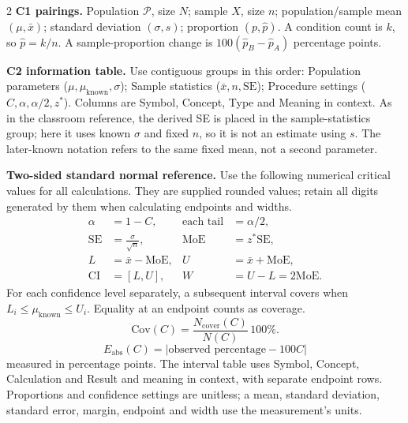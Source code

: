 \begin{multicols}{2}
\begingroup\small
\textbf{C1 pairings.} Population $\mathcal P$, size $N$; sample $X$, size $n$; population/sample mean $(\mu,\bar x)$; standard deviation $(\sigma,s)$; proportion $(p,\hat p)$. A condition count is $k$, so $\hat p=k/n$. A sample-proportion change is $100(\hat p_B-\hat p_A)$ percentage points.

\textbf{C2 information table.} Use contiguous groups in this order: Population parameters ($\mu,\mu_{\mathrm{known}},\sigma$); Sample statistics ($\bar x,n,\mathrm{SE}$); Procedure settings ($C,\alpha,\alpha/2,z^*$). Columns are Symbol, Concept, Type and Meaning in context. As in the classroom reference, the derived SE is placed in the sample-statistics group; here it uses known $\sigma$ and fixed $n$, so it is not an estimate using $s$. The later-known notation refers to the same fixed mean, not a second parameter.

\textbf{Two-sided standard normal reference.} Use the following numerical critical values for all calculations. They are supplied rounded values; retain all digits generated by them when calculating endpoints and widths.
\[
\begin{aligned}
\alpha&=1-C, &\text{each tail}&=\alpha/2,\\
\mathrm{SE}&=\frac{\sigma}{\sqrt n}, &\mathrm{MoE}&=z^*\mathrm{SE},\\
L&=\bar x-\mathrm{MoE}, &U&=\bar x+\mathrm{MoE},\\
\mathrm{CI}&=[L,U], &W&=U-L=2\mathrm{MoE}.
\end{aligned}
\]
For each confidence level separately, a subsequent interval covers when
$L_i\leq\mu_{\mathrm{known}}\leq U_i$. Equality at an endpoint counts as coverage.
\[
\mathrm{Cov}(C)=\frac{N_{\mathrm{cover}}(C)}{N(C)}\,100\%.
\]
\[
E_{\mathrm{abs}}(C)=|\text{observed percentage}-100C|
\]
measured in percentage points.
The interval table uses Symbol, Concept, Calculation and Result and meaning in context, with separate endpoint rows. Proportions and confidence settings are unitless; a mean, standard deviation, standard error, margin, endpoint and width use the measurement's units.


\end{multicols}
